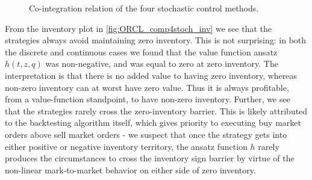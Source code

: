 \begin{figure}[H]
  \centering
  \setlength{} 
  \setlength{}
  
  \caption{Co-integration relation of the four stochastic control methods.}
  \label{fig:cointeg_relation}
\end{figure}
From the inventory plot in \autoref{fig:ORCL_comp4stoch_inv} we see that the strategies always avoid maintaining zero inventory. This is not surprising: in both the discrete and continuous cases we found that the value function ansatz $h(t,z,q)$ was non-negative, and was equal to zero at zero inventory. The interpretation is that there is no added value to having zero inventory, whereas non-zero inventory can at worst have zero value. Thus it is always profitable, from a value-function standpoint, to have non-zero inventory. Further, we see that the strategies rarely cross the zero-inventory barrier. This is likely attributed to the backtesting algorithm itself, which gives priority to executing buy market orders above sell market orders - we suspect that once the strategy gets into either positive or negative inventory territory, the ansatz function $h$ rarely produces the circumstances to cross the inventory sign barrier by virtue of the non-linear mark-to-market behavior on either side of zero inventory.

